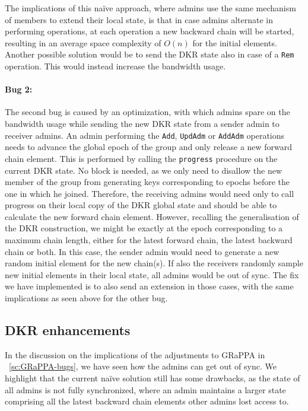 The implications of this na\"ive approach, where admins use the same
mechanism of members to extend their local state, is that in case admins
alternate in performing operations, at each operation a new backward chain
will be started, resulting in an average space complexity of $O(n)$ 
for the initial elements.
Another possible solution would be to send the DKR state also
in case of a \texttt{Rem} operation. This would instead 
increase the bandwidth usage.

\paragraph{Bug 2:} The second bug is caused by an optimization,
with which admins spare on the bandwidth usage while sending the new DKR state
from a sender admin to receiver admins.
An admin performing the \texttt{Add}, \texttt{UpdAdm} or \texttt{AddAdm} operations needs to advance the global epoch of the group and only release a new forward chain element.
This is performed by calling the \texttt{progress} procedure on the current
DKR state. No block is needed, as we only need to disallow
the new member of the group from generating keys corresponding
to epochs before the one in which he joined. Therefore, the receiving
admins would need only to call progress on their local copy of the DKR
global state and should be able to calculate the new forward chain element.
However, recalling the generalisation of the DKR construction,
we might be exactly at the epoch corresponding to a maximum chain length,
either for the latest forward chain, the latest backward chain or both.
In this case, the sender admin would need to generate a new random initial 
element for the new chain(s). If also the receivers randomly sample new 
initial elements in their local state, all admins would be out of sync.
The fix we have implemented is to also send an extension in those cases,
with the same implications as seen above for the other bug.


\subsection{DKR enhancements}\label{sc:DKR-enhancements}

In the discussion on the implications of the adjustments to GRaPPA in ~\cref{sc:GRaPPA-bugs},
we have seen how the admins can get out of sync.
We highlight that the current na\"ive solution still
has some drawbacks, as the state of all admins is not
fully synchronized, where an admin maintains a larger state
comprising all the latest backward chain elements other admins
lost access to.

